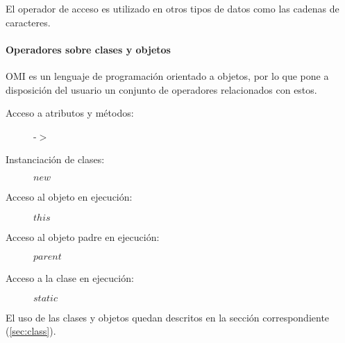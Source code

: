 El operador de acceso es utilizado en otros tipos de datos como las cadenas
de caracteres.


\paragraph{Operadores sobre clases y objetos} \label{sec:op_object}

OMI es un lenguaje de programación orientado a objetos, por lo que pone a 
disposición del usuario un conjunto de operadores relacionados con estos. \\

\begin{description}
\item [Acceso a atributos y métodos:] -$>$
\item [Instanciación de clases:] $new$
\item [Acceso al objeto en ejecución:] $this$ 
\item [Acceso al objeto padre en ejecución:] $parent$ 
\item [Acceso a la clase en ejecución:] $static$ 
\end{description} 

El uso de las clases y objetos quedan descritos en la sección correspondiente (\autoref{sec:class}).


